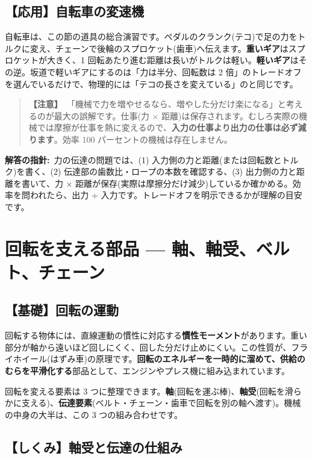 \documentclass{article}
\begin{document}
\subsection{【応用】自転車の変速機}

自転車は、この節の道具の総合演習です。ペダルのクランク(テコ)で足の力をトルクに変え、チェーンで後輪のスプロケット(歯車)へ伝えます。\textbf{重いギア}はスプロケットが大きく、1 回転あたり進む距離は長いがトルクは軽い。\textbf{軽いギア}はその逆。坂道で軽いギアにするのは「力は半分、回転数は 2 倍」のトレードオフを選んでいるだけで、物理的には「テコの長さを変えている」のと同じです。

\begin{quote}
\textbf{【注意】}\ 「機械で力を増やせるなら、増やした分だけ楽になる」と考えるのが最大の誤解です。仕事(力 × 距離)は保存されます。むしろ実際の機械では摩擦が仕事を熱に変えるので、\textbf{入力の仕事より出力の仕事は必ず減ります}。効率 100 パーセントの機械は存在しません。
\end{quote}

\textbf{解答の指針:}\ 力の伝達の問題では、(1) 入力側の力と距離(または回転数とトルク)を書く、(2) 伝達部の歯数比・ロープの本数を確認する、(3) 出力側の力と距離を書いて、力 × 距離が保存(実際は摩擦分だけ減少)しているか確かめる。効率を問われたら、出力 ÷ 入力です。トレードオフを明示できるかが理解の目安です。

\section{回転を支える部品 — 軸、軸受、ベルト、チェーン}

\subsection{【基礎】回転の運動}

回転する物体には、直線運動の慣性に対応する\textbf{慣性モーメント}があります。重い部分が軸から遠いほど回しにくく、回した分だけ止めにくい。この性質が、フライホイール(はずみ車)の原理です。\textbf{回転のエネルギーを一時的に溜めて、供給のむらを平滑化する}部品として、エンジンやプレス機に組み込まれています。

回転を変える要素は 3 つに整理できます。\textbf{軸}(回転を運ぶ棒)、\textbf{軸受}(回転を滑らかに支える)、\textbf{伝達要素}(ベルト・チェーン・歯車で回転を別の軸へ渡す)。機械の中身の大半は、この 3 つの組み合わせです。

\subsection{【しくみ】軸受と伝達の仕組み}
\end{document}
